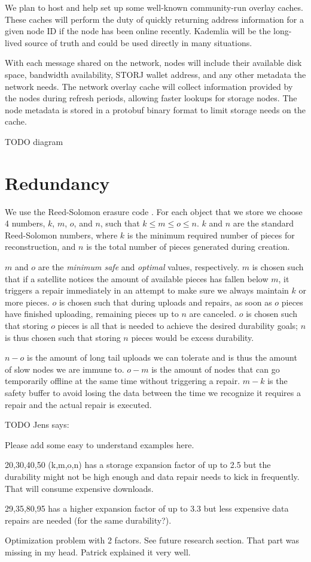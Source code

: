 \documentclass[11pt,fleqn,openany]{book}
\newcommand{\todo}[1]{{\color{red} TODO #1 }}
\begin{document}
We plan to host and help set up some well-known community-run overlay caches.
These caches will perform the duty of quickly returning address information
for a given node ID if the node has been online recently. Kademlia will be the
long-lived source of truth and could be used directly in many situations.

With each message shared on the network, nodes will include their available
disk space, bandwidth availability, STORJ wallet address, and any other
metadata the network needs.
The network overlay cache will collect information provided by the nodes
during refresh periods, allowing faster lookups for storage nodes.
The node metadata is stored in a protobuf binary format to limit storage
needs on the cache.

\todo{diagram}

\section{Redundancy}

We use the Reed-Solomon erasure code \cite{rs}. For each object that we store
we choose 4 numbers, $k$, $m$, $o$, and $n$, such that $k\le m\le o\le n$.
$k$ and $n$ are the standard Reed-Solomon numbers, where $k$ is the minimum
required number of pieces for reconstruction, and $n$ is the total number of
pieces generated during creation.

$m$ and $o$ are the {\em minimum safe} and {\em optimal} values, respectively.
$m$ is chosen such that if a satellite notices the amount of available pieces
has fallen below $m$, it triggers a repair
immediately in an attempt to make sure we always maintain
$k$ or more pieces. $o$ is chosen such that during uploads and repairs,
as soon as $o$ pieces have finished uploading, remaining pieces up to $n$ are
canceled.
$o$ is chosen such that storing $o$ pieces is all that is
needed to achieve the desired durability goals; $n$ is thus chosen such that
storing $n$ pieces would be excess durability.

$n-o$ is the amount of long tail uploads we can tolerate and is thus the amount
of slow nodes we are immune to. $o-m$ is the amount of nodes that can go
temporarily offline at the same time without triggering a repair. $m-k$ is the
safety buffer to avoid losing the data between the time we recognize it requires
a repair and the actual repair is executed.

\todo{Jens says:

Please add some easy to understand examples here.

20,30,40,50 (k,m,o,n) has a storage expansion factor of up to 2.5 but the durability might not be high enough and data repair needs to kick in frequently. That will consume expensive downloads.

29,35,80,95 has a higher expansion factor of up to 3.3 but less expensive data repairs are needed (for the same durability?).

Optimization problem with 2 factors. See future research section. That part was missing in my head. Patrick explained it very well.
}
\end{document}
